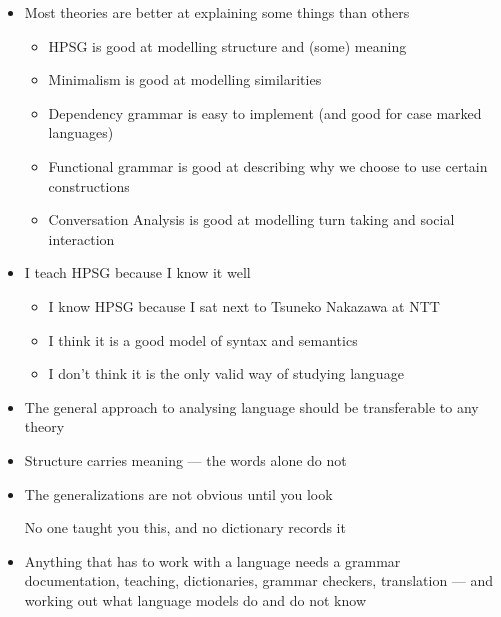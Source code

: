 \documentclass[a4paper,landscape,headrule,footrule]{foils}
\begin{document}
\begin{itemize}
\item Most theories are better at explaining some things than others
  \begin{itemize}
  \item HPSG is good at modelling structure and (some) meaning
  \item Minimalism is good at modelling similarities
  \item Dependency grammar is easy to implement (and  good for case marked languages)
  \item Functional grammar is good at describing why we choose to use certain constructions
  \item Conversation Analysis is good at modelling turn taking and social interaction
  \end{itemize}
\item I teach HPSG because I know it well
  \begin{itemize}
  \item I know HPSG because I sat next to Tsuneko Nakazawa at NTT
  \item I think it is a good model of syntax and semantics
  \item I don't think it is the only valid way of studying language
  \end{itemize}
\item The general approach to analysing language should be transferable to any theory
\end{itemize}



\begin{itemize}
\item Structure carries meaning --- the words alone do not
  \begin{exe}
  \ex {} 
  \ex {} 
  \end{exe}
\item The generalizations are not obvious until you look
  \begin{exe}
  \ex {}
  \ex {}
  \end{exe}
  No one taught you this, and no dictionary records it
\item Anything that has to work with a language needs a grammar
  \\ documentation, teaching, dictionaries, grammar checkers, translation
  --- and working out what language models do and do not know
\end{itemize}
\end{document}
